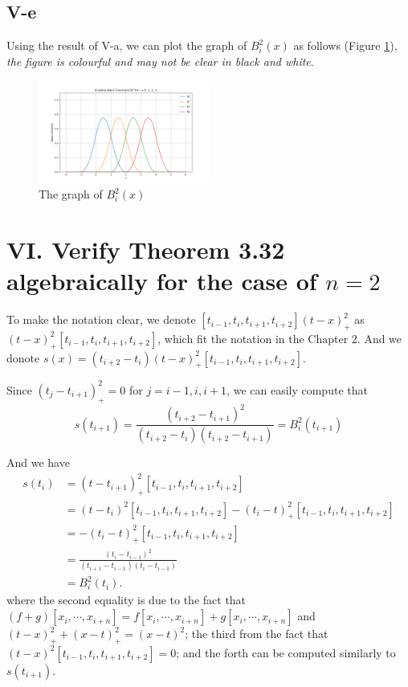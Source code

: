 \documentclass[a4paper]{article}
\begin{document}
\subsection*{V-e}
Using the result of V-a, we can plot the graph of $B_i^2(x)$ as follows (Figure \ref{fig:1}), \textit{the figure is colourful and may not be clear in black and white}.
\begin{figure}[h]
  \centering
  \includegraphics[width=0.5\textwidth]{B-spline.png}
  \caption{The graph of $B_i^2(x)$}
  \label{fig:1}
\end{figure}

\section*{VI. Verify Theorem 3.32 algebraically for the case of $n = 2$} 
To make the notation clear, we denote $[t_{i-1}, t_i, t_{i+1},t_{i+2}](t-x)^2_+$ as $(t-x)^2_+{[t_{i-1}, t_i, t_{i+1},t_{i+2}]}$, which fit the notation in the Chapter 2. And we donote $s(x) = (t_{i+2}-t_i)(t-x)^2_+[t_{i-1},t_i,t_{i+1},t_{i+2}]$.

Since $(t_j -t_{i+1})_+^2 = 0$ for $j = i-1, i, i+1$, we can easily compute that \[s(t_{i+1}) = \frac{(t_{i+2}-t_{i+1})^2}{(t_{i+2}-t_{i})(t_{i+2}-t_{i+1})} = B^2_i(t_{i+1})\]

And we have
\begin{align*}
  s(t_{i}) &= (t-t_{i+1})^2_+{[t_{i-1}, t_i, t_{i+1},t_{i+2}]}\\
  &= (t-t_{i})^2{[t_{i-1}, t_i, t_{i+1},t_{i+2}]} - (t_{i}-t)^2_+{[t_{i-1}, t_i, t_{i+1},t_{i+2}]}\\
&= - (t_{i}-t)^2_+{[t_{i-1}, t_i, t_{i+1},t_{i+2}]}\\
&=\frac{(t_i-t_{i-1})^2}{(t_{i+1} - t_{i-1})(t_i - t_{i-1})}\\
&= B^2_i(t_{i}).
\end{align*}
where the second equality is due to the fact that $(f + g)[x_i,\cdots,x_{i+n}] = f[x_i,\cdots,x_{i+n}] + g[x_i,\cdots,x_{i+n}]$ and $(t - x)^2_+ +(x-t)^2_+ = (x-t)^2$; the third from the fact that $(t-x)^2{[t_{i-1}, t_i, t_{i+1},t_{i+2}]} = 0$; and the forth can be computed similarly to $s(t_{i+1})$.
\end{document}
